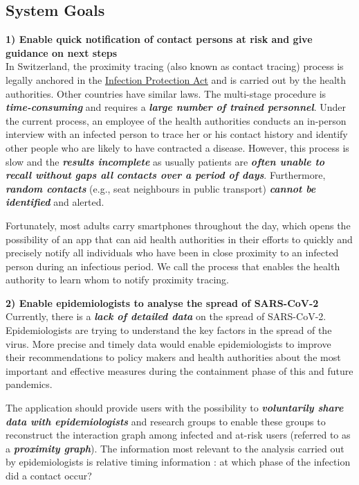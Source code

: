 \documentclass[10.8pt,a4paper]{article}
\begin{document}
\subsection{System Goals}
\textbf{1) Enable quick notification of contact persons at risk and give guidance on next
steps}\\
In Switzerland, the proximity tracing (also known as contact tracing) process is legally
anchored in the \href{http://www.rki.de}{\underline{Infection Protection Act}} and is carried out by the health authorities. Other countries have similar laws. The multi-stage procedure is \textbf{\textit{time-consuming}} and requires a \textbf{\textit{large number of trained personnel}}. Under the current process, an employee of the health authorities conducts an in-person interview with an infected person to trace her or his contact history and identify other people who are likely to have contracted a disease. However, this process is slow and the \textbf{\textit{results incomplete}} as usually patients are \textbf{\textit{often unable to recall without gaps all contacts over a period of days}}. Furthermore, \textbf{\textit{random contacts}} (e.g., seat neighbours in public transport) \textbf{\textit{cannot be identified}}  and alerted.

Fortunately, most adults carry smartphones throughout the day, which opens the possibility
of an app that can aid health authorities in their efforts to quickly and precisely notify all individuals who have been in close proximity to an infected person during an infectious period. We call the process that enables the health authority to learn whom to notify proximity tracing.

\textbf{2) Enable epidemiologists to analyse the spread of SARS-CoV-2}\\
Currently, there is a \textbf{\textit{lack of detailed data}} on the spread of SARS-CoV-2. Epidemiologists
are trying to understand the key factors in the spread of the virus. More precise and timely
data would enable epidemiologists to improve their recommendations to policy makers and
health authorities about the most important and effective measures during the containment
phase of this and future pandemics.

The application should provide users with the possibility to \textbf{\textit{voluntarily share data with epidemiologists}} and research groups to enable these groups to reconstruct the interaction graph among infected and at-risk users (referred to as a \textbf{\textit{proximity graph}}). The information most relevant to the analysis carried out by epidemiologists is  relative timing information : at which phase of the infection did a contact occur?
\end{document}
